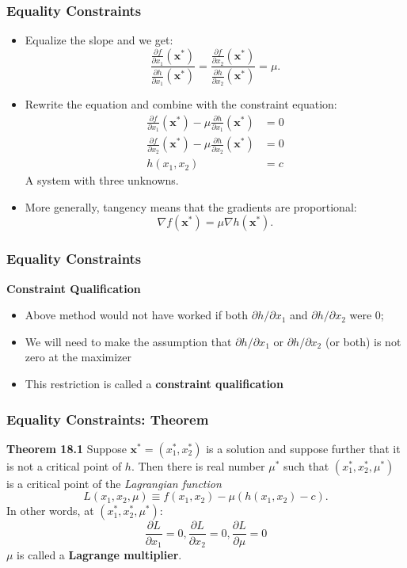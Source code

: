 \documentclass[9pt,aspectratio=169]{beamer}
\begin{document}
	
\begin{frame}
	\frametitle{Equality Constraints}
	\begin{itemize}
        \item Equalize the slope and we get:
		$$\frac{\frac{\partial f}{\partial x_1}(\mathbf{x^*})}{\frac{\partial h}{\partial x_1}(\mathbf{x^*})} = \frac{\frac{\partial f}{\partial x_2}(\mathbf{x^*})}{\frac{\partial h}{\partial x_2}(\mathbf{x^*})} = \mu.$$
		\item Rewrite the equation and combine with the constraint equation:
		\begin{align}
		\frac{\partial f}{\partial x_1}(\mathbf{x^*})-\mu\frac{\partial h}{\partial x_1}(\mathbf{x^*}) &= 0 \nonumber \\
		\frac{\partial f}{\partial x_2}(\mathbf{x^*})-\mu\frac{\partial h}{\partial x_2}(\mathbf{x^*}) &= 0 \nonumber \\
		h(x_1,x_2) &= c \nonumber 
		\end{align}
		 A system with three unknowns.
         \item More generally, tangency means that the gradients are
         proportional:
         $$\nabla f(\mathbf{x^*})=\mu\nabla h(\mathbf{x^*}).$$

	\end{itemize}
\end{frame}


\begin{frame}
	\frametitle{Equality Constraints}
	\begin{block}{\textbf{Constraint Qualification}}
		\begin{itemize}
			\item Above method would not have worked if both $\partial
            h/\partial x_1$ and $\partial h/\partial x_2$ were 0;
			\item We will need to make the assumption that $\partial
            h/\partial x_1$ or $\partial h/\partial x_2$ (or both) is not
            zero at the maximizer
			\item This restriction is called a \textbf{constraint qualification}
		\end{itemize}
	\end{block}
\end{frame}
				
\begin{frame}
	\frametitle{Equality Constraints: Theorem}
	\begin{block}{\textbf{Theorem 18.1}}
        Suppose $\mathbf{x^*} = (x_1^*,x_2^*)$ is a solution and suppose
        further that it is not a critical point of $h$. Then there is real
        number $\mu^*$ such that $(x_1^*,x_2^*,\mu^*)$ is a critical point of
        the \emph{Lagrangian function}
	$$L(x_1,x_2,\mu) \equiv f(x_1,x_2)-\mu(h(x_1,x_2)-c).$$ In other words, at $(x_1^*,x_2^*,\mu^*)$:
	$$\frac{\partial L}{\partial x_1}=0, \frac{\partial L}{\partial x_2}=0, \frac{\partial L}{\partial \mu}=0$$
	$\mu$ is called a \textbf{Lagrange multiplier}.
	\end{block}
\end{frame}
		
\end{document}
